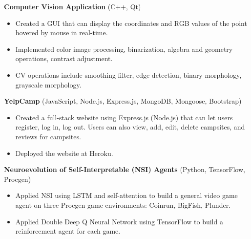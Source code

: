 \documentclass{article}
\begin{document}
\vspace{1em}

\textbf{Computer Vision Application} (C++, Qt)

\begin{itemize}[nosep]
	\item Created a GUI that can display the coordinates and RGB values of the point hovered by mouse in real-time.
	\item Implemented color image processing, binarization, algebra and geometry operations, contrast adjustment.
	\item CV operations include smoothing filter, edge detection, binary morphology,
	grayscale morphology.
\end{itemize}

\vspace{1em}

\textbf{YelpCamp} (JavaScript, Node.js, Express.js, MongoDB, Mongoose, Bootstrap)

\begin{itemize}[nosep]
	\item Created a full-stack website using Express.js (Node.js) that can let users register, log in, log out. Users can also view, add, edit, delete
	campsites, and reviews for campsites.
	\item Deployed the website at Heroku.
\end{itemize}

\vspace{1em}

\textbf{Neuroevolution of Self-Interpretable (NSI) Agents} (Python, TensorFlow, Procgen)

\begin{itemize}[nosep]
	\item Applied NSI using LSTM and self-attention to build a general video game agent on three Procgen game environments: Coinrun, BigFish, Plunder.
	\item Applied Double Deep Q Neural Network using TensorFlow to build a reinforcement agent for each game.
\end{itemize}
\end{document}
